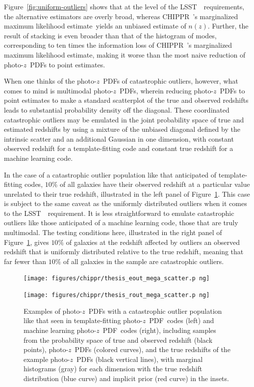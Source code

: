 \documentclass[iop]{emulateapj}
\newcommand{\Fig}[1]{Figure~\ref{#1}}
\newcommand{\project}[1]{{\textsc{#1}}~}
\newcommand{\lsst}{\project{LSST}}
\newcommand{\Chippr}{\project{CHIPPR}}
\newcommand{\nz}{$n(z)$}
\newcommand{\pz}{photo-$z$~}
\newcommand{\pzpdf}{\pz PDF}
\newcommand{\mmle}{marginalized maximum likelihood estimate}
\begin{document}
\Fig{fig:uniform-outliers} shows that at the level of the \lsst\ requirements, 
the alternative estimators are overly broad, whereas \Chippr's \mmle\ yields an 
unbiased estimate of \nz.
Further, the result of stacking is even broader than that of the histogram of 
modes, corresponding to ten times the information loss of \Chippr's \mmle, 
making it worse than the most naive reduction of \pzpdf s to point estimates.

When one thinks of the \pzpdf s of catastrophic outliers, however, what comes 
to mind is multimodal \pzpdf s, wherein reducing \pzpdf s to point estimates to 
make a standard scatterplot of the true and observed redshifts leads to 
substantial probability density off the diagonal.
These coordinated catastrophic outliers may be emulated in the joint 
probability space of true and estimated redshifts by using a mixture of the 
unbiased diagonal defined by the intrinsic scatter and an additional Gaussian 
in one dimension, with constant observed redshift for a template-fitting code 
and constant true redshift for a machine learning code.

In the case of a catastrophic outlier population like that anticipated of 
template-fitting codes, $10\%$ of all galaxies have their observed redshift at 
a particular value unrelated to their true redshift, illustrated in the left 
panel of \Fig{fig:nonuniform-outliers-data}.
This case is subject to the same caveat as the uniformly distributed outliers 
when it comes to the \lsst\ requirement.
It is less straightforward to emulate catastrophic outliers like those 
anticipated of a machine learning code, those that are truly multimodal.
The testing conditions here, illustrated in the right panel of 
\Fig{fig:nonuniform-outliers-data}, gives $10\%$ of galaxies at the redshift 
affected by outliers an observed redshift that is uniformly distributed 
relative to the true redshift, meaning that far fewer than $10\%$ of all 
galaxies in the sample are catastrophic outliers.

\begin{figure}
	
\texttt{[image: figures/chippr/thesis\_eout\_mega\_scatter.p
ng]}
	
\texttt{[image: figures/chippr/thesis\_rout\_mega\_scatter.p
ng]}
	\caption{
		Examples of \pzpdf s with a catastrophic outlier population 
like that seen in template-fitting \pzpdf\ codes (left) and machine learning 
\pzpdf\ codes (right), including samples from the probability space of true and 
observed redshift (black points), \pzpdf s (colored curves), and the true 
redshifts of the example \pzpdf s (black vertical lines), with marginal 
histograms (gray) for each dimension with the true redshift distribution (blue 
curve) and implicit prior (red curve) in the insets.
	}
	\label{fig:nonuniform-outliers-data}
\end{figure}
\end{document}
